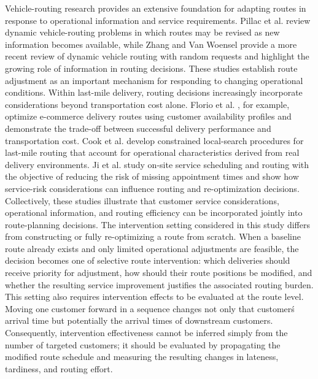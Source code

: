 \documentclass[11pt,a4paper]{article}
\begin{document}
Vehicle-routing research provides an extensive foundation for adapting
routes in response to operational information and service requirements.
Pillac et al. \cite{pillac2013} review dynamic vehicle-routing problems in which
routes may be revised as new information becomes available, while Zhang
and Van Woensel \cite{zhang2023} provide a more recent review of dynamic vehicle
routing with random requests and highlight the growing role of
information in routing decisions. These studies establish route
adjustment as an important mechanism for responding to changing
operational conditions. Within last-mile delivery, routing decisions
increasingly incorporate considerations beyond transportation cost
alone. Florio et al. \cite{florio2018}, for example, optimize e-commerce delivery
routes using customer availability profiles and demonstrate the
trade-off between successful delivery performance and transportation
cost. Cook et al. \cite{cook2024} develop constrained local-search procedures for
last-mile routing that account for operational characteristics derived
from real delivery environments. Ji et al. \cite{ji2022} study on-site service
scheduling and routing with the objective of reducing the risk of
missing appointment times and show how service-risk considerations can
influence routing and re-optimization decisions. Collectively, these
studies illustrate that customer service considerations, operational
information, and routing efficiency can be incorporated jointly into
route-planning decisions. The intervention setting considered in this
study differs from constructing or fully re-optimizing a route from
scratch. When a baseline route already exists and only limited
operational adjustments are feasible, the decision becomes one of
selective route intervention: which deliveries should receive priority
for adjustment, how should their route positions be modified, and
whether the resulting service improvement justifies the associated
routing burden. This setting also requires intervention effects to be
evaluated at the route level. Moving one customer forward in a sequence
changes not only that customer\'s arrival time but
potentially the arrival times of downstream customers. Consequently,
intervention effectiveness cannot be inferred simply from the number of
targeted customers; it should be evaluated by propagating the modified
route schedule and measuring the resulting changes in lateness,
tardiness, and routing effort.
\end{document}
